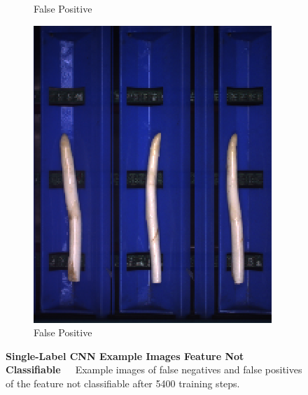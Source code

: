 \begin{figure}[h]
\begin{subfigure}{0.3\textwidth}
		\vspace{-5pt}
		\caption{False Positive}
	\end{subfigure}
	\begin{subfigure}{0.3\textwidth}
		\includegraphics[width=0.9\linewidth]{Figures/appendix/notclassifiable_falsepositive_03.png}
		\vspace{-5pt}
		\caption{False Positive}
	\end{subfigure}
    \caption[Single-Label CNN Example Images Feature Not Classifiable]{\textbf{Single-Label CNN Example Images Feature Not Classifiable}~~~Example images of false negatives and false positives of the feature not classifiable after 5400 training steps.}
	\vspace{-20pt}
    \label{fig:ExampleImagesNotClassifiable}
\end{figure}

